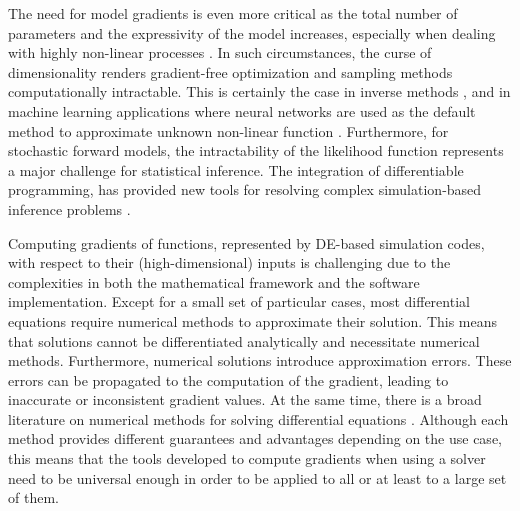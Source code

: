 The need for model gradients is even more critical as the total number of parameters and the expressivity of the model increases, especially when dealing with highly non-linear processes \cite{Karniadakis_Kevrekidis_Lu_Perdikaris_Wang_Yang_2021}.
In such circumstances, the curse of dimensionality renders gradient-free optimization and sampling methods computationally intractable. 
This is certainly the case in inverse methods \cite{Tarantola:2007wu}, and in
machine learning applications where neural networks are used as the default method to approximate unknown non-linear function \cite{LeCun2015}.
Furthermore, for stochastic forward models, the intractability of the likelihood function represents a major challenge for statistical inference.
The integration of differentiable programming, has provided new tools for resolving complex simulation-based inference problems \cite{Cranmer_Brehmer_Louppe_2020}.

Computing gradients of functions, represented by DE-based simulation codes, with respect to their (high-dimensional) inputs is challenging due to the complexities in both the mathematical framework and the software implementation.
Except for a small set of particular cases, most differential equations require numerical methods to approximate their solution.
This means that solutions cannot be differentiated analytically and necessitate numerical methods. 
Furthermore, numerical solutions introduce approximation errors. 
These errors can be propagated to the computation of the gradient, leading to inaccurate or inconsistent gradient values. 
At the same time, there is a broad literature on numerical methods for solving differential equations \cite{hairer-solving-1, hairer-solving-2}. 
Although each method provides different guarantees and advantages depending on the use case, this means that the tools developed to compute gradients when using a solver need to be universal enough in order to be applied to all or at least to a large set of them. 

